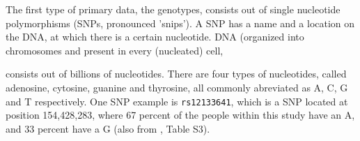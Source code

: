 The first type of primary data, the genotypes, 
consists out of single nucleotide polymorphisms (SNPs, pronounced 'snips').
A SNP has a name and a location on the DNA, at which there is a certain nucleotide.
DNA (organized into chromosomes and present in every (nucleated) cell, 

consists out of billions of nucleotides.
There are four types of nucleotides, 
called adenosine, cytosine, guanine and thyrosine, all commonly abreviated
as A, C, G and T respectively.
One SNP example is \verb|rs12133641|, which is a SNP located at position 
154,428,283, where 67 percent of the people within this study have an A,
and 33 percent have a G (also from \cite{ahsan2017relative}, Table S3).

